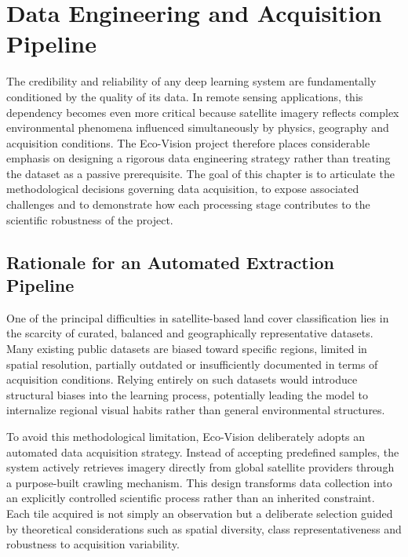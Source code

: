 \documentclass[12pt,a4paper]{report}
\begin{document}
\newpage


\chapter{Data Engineering and Acquisition Pipeline}

The credibility and reliability of any deep learning system are fundamentally conditioned by the quality of its data. In remote sensing applications, this dependency becomes even more critical because satellite imagery reflects complex environmental phenomena influenced simultaneously by physics, geography and acquisition conditions. The Eco-Vision project therefore places considerable emphasis on designing a rigorous data engineering strategy rather than treating the dataset as a passive prerequisite. The goal of this chapter is to articulate the methodological decisions governing data acquisition, to expose associated challenges and to demonstrate how each processing stage contributes to the scientific robustness of the project.

\section{Rationale for an Automated Extraction Pipeline}

One of the principal difficulties in satellite-based land cover classification lies in the scarcity of curated, balanced and geographically representative datasets. Many existing public datasets are biased toward specific regions, limited in spatial resolution, partially outdated or insufficiently documented in terms of acquisition conditions. Relying entirely on such datasets would introduce structural biases into the learning process, potentially leading the model to internalize regional visual habits rather than general environmental structures.

To avoid this methodological limitation, Eco-Vision deliberately adopts an automated data acquisition strategy. Instead of accepting predefined samples, the system actively retrieves imagery directly from global satellite providers through a purpose-built crawling mechanism. This design transforms data collection into an explicitly controlled scientific process rather than an inherited constraint. Each tile acquired is not simply an observation but a deliberate selection guided by theoretical considerations such as spatial diversity, class representativeness and robustness to acquisition variability.
\end{document}
